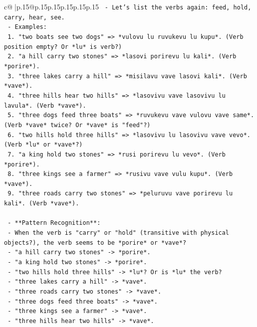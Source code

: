 \documentclass{article}
\begin{document}
{\begin{supertabular}{c@{$\;$}|p{.15\linewidth}@{}p{.15\linewidth}p{.15\linewidth}p{.15\linewidth}p{.15\linewidth}p{.15\linewidth}}
{{{\texttt{         {-} Let's list the verbs again: feed, hold, carry, hear, see.} \\
\texttt{         {-} Examples:} \\
\texttt{           1. "two boats see two dogs" => *vulovu lu ruvukevu lu kupu*. (Verb position empty? Or *lu* is verb?)} \\
\texttt{           2. "a hill carry two stones" => *lasovi porirevu lu kali*. (Verb *porire*).} \\
\texttt{           3. "three lakes carry a hill" => *misilavu vave lasovi kali*. (Verb *vave*).} \\
\texttt{           4. "three hills hear two hills" => *lasovivu vave lasovivu lu lavula*. (Verb *vave*).} \\
\texttt{           5. "three dogs feed three boats" => *ruvukevu vave vulovu vave same*. (Verb *vave* twice? Or *vave* is "feed"?)} \\
\texttt{           6. "two hills hold three hills" => *lasovivu lu lasovivu vave vevo*. (Verb *lu* or *vave*?)} \\
\texttt{           7. "a king hold two stones" => *rusi porirevu lu vevo*. (Verb *porire*).} \\
\texttt{           8. "three kings see a farmer" => *rusivu vave vulu kupu*. (Verb *vave*).} \\
\texttt{           9. "three roads carry two stones" => *peluruvu vave porirevu lu kali*. (Verb *vave*).} \\
\\ 
\texttt{   {-} **Pattern Recognition**:} \\
\texttt{     {-} When the verb is "carry" or "hold" (transitive with physical objects?), the verb seems to be *porire* or *vave*?} \\
\texttt{     {-} "a hill carry two stones" {-}> *porire*.} \\
\texttt{     {-} "a king hold two stones" {-}> *porire*.} \\
\texttt{     {-} "two hills hold three hills" {-}> *lu*? Or is *lu* the verb?} \\
\texttt{     {-} "three lakes carry a hill" {-}> *vave*.} \\
\texttt{     {-} "three roads carry two stones" {-}> *vave*.} \\
\texttt{     {-} "three dogs feed three boats" {-}> *vave*.} \\
\texttt{     {-} "three kings see a farmer" {-}> *vave*.} \\
\texttt{     {-} "three hills hear two hills" {-}> *vave*.} \\
}}}
\end{supertabular}}
\end{document}
